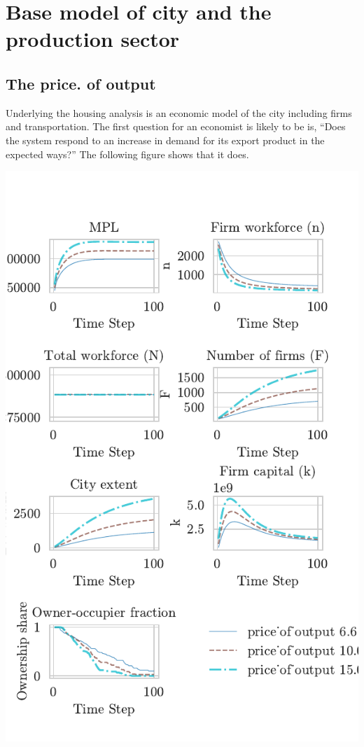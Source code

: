 

\section{Base model of city and the production sector}
\newpage
 \subsection{The price. of output}
Underlying the housing analysis is an economic model of the city including firms and transportation.  The first question for an economist is likely to be is, ``Does the system respond to an increase in demand for its export product in the expected ways?'' The following figure shows that it does. 


\includegraphics[scale=1]{fig/Analysis/price3.pdf}

